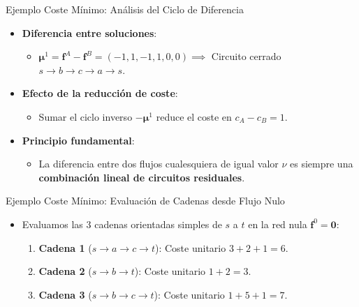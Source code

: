 \documentclass[
  ignorenonframetext,
]{beamer}
\providecommand{\tightlist}{%
  \setlength{\itemsep}{0pt}\setlength{\parskip}{0pt}}
\begin{document}
\begin{frame}{Ejemplo Coste Mínimo: Análisis del Ciclo de Diferencia}
\label{ejemplo-coste-muxednimo-anuxe1lisis-del-ciclo-de-diferencia}
\begin{itemize}
\tightlist
\item
  \textbf{Diferencia entre soluciones}:

  \begin{itemize}
  \tightlist
  \item
    \(\mathbf{\mu}^1 = \mathbf{f}^A - \mathbf{f}^B = (-1, 1, -1, 1, 0, 0) \implies\)
    Circuito cerrado \(s \to b \to c \to a \to s\).
  \end{itemize}
\item
  \textbf{Efecto de la reducción de coste}:

  \begin{itemize}
  \tightlist
  \item
    Sumar el ciclo inverso \(-\mathbf{\mu}^1\) reduce el coste en
    \(c_A - c_B = 1\).
  \end{itemize}
\item
  \textbf{Principio fundamental}:

  \begin{itemize}
  \tightlist
  \item
    La diferencia entre dos flujos cualesquiera de igual valor \(\nu\)
    es siempre una \textbf{combinación lineal de circuitos residuales}.
  \end{itemize}
\end{itemize}
\end{frame}

\begin{frame}{Ejemplo Coste Mínimo: Evaluación de Cadenas desde Flujo
Nulo}
\label{ejemplo-coste-muxednimo-evaluaciuxf3n-de-cadenas-desde-flujo-nulo}
\begin{itemize}
\tightlist
\item
  Evaluamos las 3 cadenas orientadas simples de \(s\) a \(t\) en la red
  nula \(\mathbf{f}^0 = \mathbf{0}\):

  \begin{enumerate}
  \tightlist
  \item
    \textbf{Cadena 1} (\(s \to a \to c \to t\)): Coste unitario
    \(3 + 2 + 1 = 6\).
  \item
    \textbf{Cadena 2} (\(s \to b \to t\)): Coste unitario \(1 + 2 = 3\).
  \item
    \textbf{Cadena 3} (\(s \to b \to c \to t\)): Coste unitario
    \(1 + 5 + 1 = 7\).
  \end{enumerate}
\end{itemize}
\end{frame}
\end{document}
